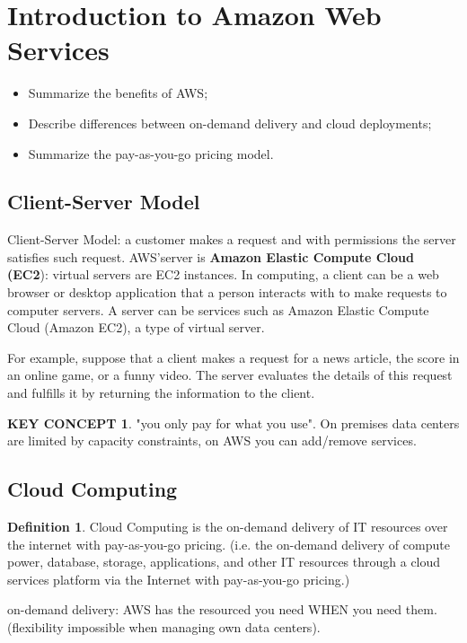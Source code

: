 \documentclass{article}
\theoremstyle{definition}
\newtheorem{df}{Definition}
\newtheorem{kc}{KEY CONCEPT}
\begin{document}
\newpage
\section{Introduction to Amazon Web Services}
\begin{itemize}
\item Summarize the benefits of AWS;
\item Describe differences between on-demand delivery and cloud deployments;
\item Summarize the pay-as-you-go pricing model.
\end{itemize}
\subsection{Client-Server Model}
Client-Server Model: a customer makes a request and with permissions the server satisfies such request. AWS'server is \textbf{Amazon Elastic Compute Cloud (EC2}): virtual servers are EC2 instances.
In computing, a client can be a web browser or desktop application that a person interacts with to make requests to computer servers. A server can be services such as Amazon Elastic Compute Cloud (Amazon EC2), a type of virtual server.

For example, suppose that a client makes a request for a news article, the score in an online game, or a funny video. The server evaluates the details of this request and fulfills it by returning the information to the client.

\begin{kc} "you only pay for what you use". On premises data centers are limited by capacity constraints, on AWS you can add/remove services.\end{kc}

\subsection{Cloud Computing}
\begin{df}Cloud Computing is the on-demand delivery of IT resources over the internet with pay-as-you-go pricing. (i.e. the on-demand delivery of compute power, database, storage, applications, and other IT resources through a cloud services platform via the Internet with pay-as-you-go pricing.)\end{df}
on-demand delivery: AWS has the resourced you need WHEN you need them. (flexibility impossible when managing own data centers).\\
\end{document}
